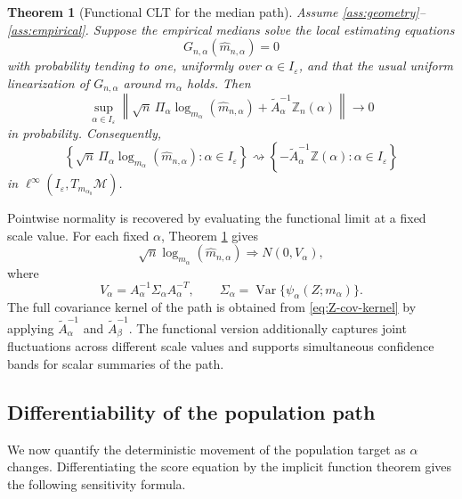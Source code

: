 \documentclass[11pt]{article}
\newtheorem{theorem}{Theorem}
\DeclareMathOperator{\Var}{Var}
\newcommand{\M}{\mathcal M}
\newcommand{\eps}{\varepsilon}
\newcommand{\1}{\mathbf{1}}
\begin{document}
\begin{theorem}[Functional CLT for the median path]\label{thm:functional-clt}
Assume \ref{ass:geometry}--\ref{ass:empirical}.  Suppose the empirical medians solve the local estimating equations
\[
 G_{n,\alpha}(\widehat m_{n,\alpha})=0
\]
with probability tending to one, uniformly over $\alpha\in I_\eps$, and that the usual uniform linearization of $G_{n,\alpha}$ around $m_\alpha$ holds.  Then
\begin{equation}\label{eq:uniform-linear-expansion}
 \sup_{\alpha\in I_\eps}
 \left\|
 \sqrt n\,\Pi_\alpha\log_{m_\alpha}(\widehat m_{n,\alpha})
 +
 \widetilde A_\alpha^{-1}\mathbb Z_n(\alpha)
 \right\|
 \to0
\end{equation}
in probability.  Consequently,
\begin{equation}\label{eq:functional-clt}
 \left\{
 \sqrt n\,\Pi_\alpha\log_{m_\alpha}(\widehat m_{n,\alpha})
 :\alpha\in I_\eps
 \right\}
 \rightsquigarrow
 \left\{-\widetilde A_\alpha^{-1}\mathbb Z(\alpha):\alpha\in I_\eps\right\}
\end{equation}
in $\ell^\infty(I_\eps,T_{m_{\alpha_0}}\M)$.
\end{theorem}


Pointwise normality is recovered by evaluating the functional limit at a fixed
scale value. For each fixed $\alpha$, Theorem \ref{thm:functional-clt} gives
\[
 \sqrt n\log_{m_\alpha}(\widehat m_{n,\alpha})
 \Rightarrow
 N(0,V_\alpha),
\]
where
\begin{equation}\label{eq:fixed-alpha-cov}
 V_\alpha=A_\alpha^{-1}\Sigma_\alpha A_\alpha^{-T},
 \qquad
 \Sigma_\alpha=\Var\{\psi_\alpha(Z;m_\alpha)\}.
\end{equation}
The full covariance kernel of the path is obtained from \eqref{eq:Z-cov-kernel} by applying $\widetilde A_\alpha^{-1}$ and $\widetilde A_\beta^{-1}$. The functional version additionally captures joint fluctuations across
different scale values and supports simultaneous confidence bands for scalar
summaries of the path.

\subsection{Differentiability of the population path}

We now quantify the deterministic movement of the population target as
$\alpha$ changes.  Differentiating the score equation by the implicit function
theorem gives the following sensitivity formula.
\end{document}
